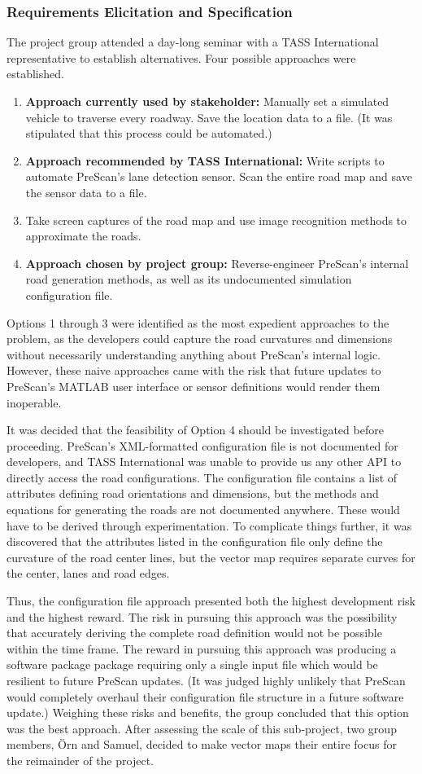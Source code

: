 \documentclass[12pt,twoside]{article}
\begin{document}
\subsubsection{Requirements Elicitation and Specification}
The project group attended a day-long seminar with a TASS International representative to establish alternatives. Four possible approaches were established.
\begin{enumerate}
  \item \textbf{Approach currently used by stakeholder:} Manually set a simulated vehicle to traverse every roadway. Save the location data to a file. (It was stipulated that this process could be automated.)
  \item \textbf{Approach recommended by TASS International:} Write scripts to automate PreScan's lane detection sensor. Scan the entire road map and save the sensor data to a file.
  \item Take screen captures of the road map and use image recognition methods to approximate the roads.
  \item \textbf{Approach chosen by project group:} Reverse-engineer PreScan’s internal road generation methods, as well as its undocumented simulation configuration file.
\end{enumerate}
Options 1 through 3 were identified as the most expedient approaches to the problem, as the developers could capture the road curvatures and dimensions without necessarily understanding anything about PreScan's internal logic. However, these naive approaches came with the risk that future updates to PreScan's MATLAB user interface or sensor definitions would render them inoperable.

It was decided that the feasibility of Option 4 should be investigated before proceeding. PreScan's XML-formatted configuration file is not documented for developers, and TASS International was unable to provide us any other API to directly access the road configurations. The configuration file contains a list of attributes defining road orientations and dimensions, but the methods and equations for generating the roads are not documented anywhere. These would have to be derived through experimentation. To complicate things further, it was discovered that the attributes listed in the configuration file only define the curvature of the road center lines, but the vector map requires separate curves for the center, lanes and road edges.

Thus, the configuration file approach presented both the highest development risk and the highest reward. The risk in pursuing this approach was the possibility that accurately deriving the complete road definition would not be possible within the time frame. The reward in pursuing this approach was producing a software package package requiring only a single input file which would be resilient to future PreScan updates. (It was judged highly unlikely that PreScan would completely overhaul their configuration file structure in a future software update.) Weighing these risks and benefits, the group concluded that this option was the best approach. After assessing the scale of this sub-project, two group members, Örn and Samuel, decided to make vector maps their entire focus for the reimainder of the project.
\end{document}
